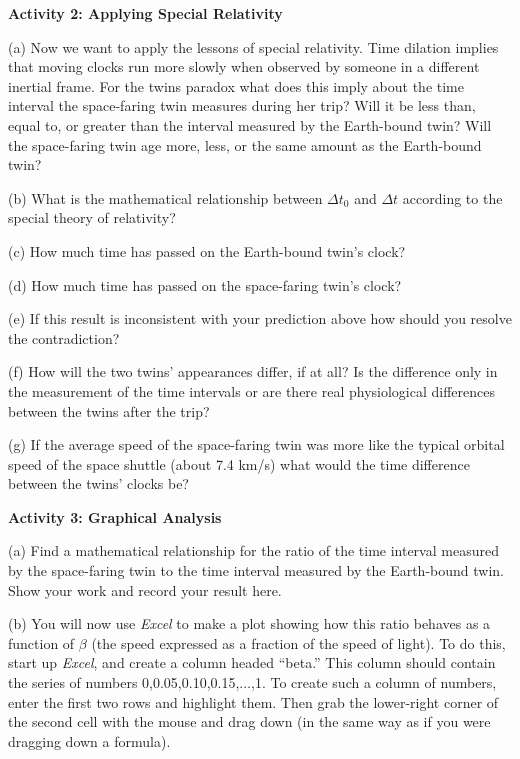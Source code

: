\pagebreak[3]
\textbf{Activity 2: Applying Special Relativity}

(a) Now we want to apply the lessons of special relativity. Time dilation
implies that moving clocks run more slowly when observed by someone
in a different inertial frame. For the twins paradox what does this
imply about the time interval the space-faring twin measures during
her trip? Will it be less than, equal to, or greater than the interval
measured by the Earth-bound twin? Will the space-faring twin age more,
less, or the same amount as the Earth-bound twin?
\answerspace{35mm}

(b) What is the mathematical relationship between \( \Delta  t_{0} \)
and \( \Delta  t\) according to the special theory of relativity?
\answerspace{15mm}

(c) How much time has passed on the Earth-bound twin's clock?
\answerspace{15mm}

(d) How much time has passed on the space-faring twin's clock?
\answerspace{15mm}

(e) If this result is inconsistent with your prediction above how
should you resolve the contradiction?
\answerspace{15mm}

(f) How will the two twins' appearances differ, if at all? Is the
difference only in the measurement of the time intervals or are there
real physiological differences between the twins after the trip?
\answerspace{15mm}

(g) If the average speed of the space-faring twin was more like the
typical orbital speed of the space shuttle (about 7.4 km/s) what would
the time difference between the twins' clocks be?
\answerspace{15mm}

\pagebreak[3]
\textbf{Activity 3: Graphical Analysis}

(a) Find a mathematical relationship for the ratio of the time interval
measured by the space-faring twin to the time interval measured by
the Earth-bound twin. Show your work and record your result here.
\answerspace{45mm}

(b) You will now use \textit{Excel} to make a plot showing how this
ratio behaves as a function of $\beta$ (the speed expressed
as a fraction of the speed of light).
To do this, start up \textit{Excel}, and create a column headed
``beta.''  This column should contain the series of numbers
0,0.05,0.10,0.15,$\ldots$,1.    To create
such a column of numbers, enter the first two rows and highlight
them.  Then grab the lower-right corner of the second cell with
the mouse and drag down (in the same way as if you were dragging
down a formula).  

